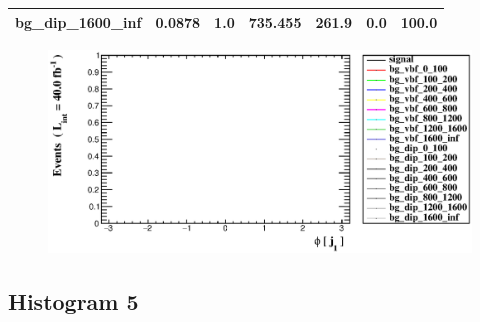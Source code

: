 \documentclass[a4paper, 10pt]{article}
\begin{document}
\begin{table}[H]
\begin{center}
\begin{tabular}{|m{23.0mm}|m{23.0mm}|m{18.0mm}|m{19.0mm}|m{19.0mm}|m{19.0mm}|m{19.0mm}|}
      \hline
      {\cellcolor{white}         bg\_dip\_1600\_inf}& {\cellcolor{white}         0.0878}& {\cellcolor{white}         1.0}& {\cellcolor{white}         735.455}& {\cellcolor{white}         261.9}& {\cellcolor{red}         0.0}& {\cellcolor{red}         100.0}\\
\hline
    \end{tabular}
  \end{center}
\end{table}

\begin{figure}[H]
  \begin{center}
    \includegraphics[scale=0.45]{selection_3.eps}\\
\caption{   }
  \end{center}
\end{figure}
      \newpage
\subsection{ Histogram 5}
\end{document}
